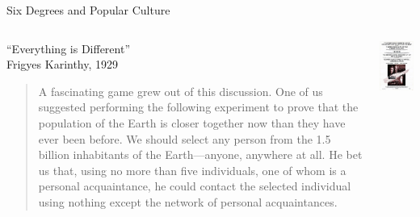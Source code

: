 \begin{frame}{Six Degrees and Popular Culture}

\begin{columns}
\begin{column}{0.65\textwidth}
\begin{block}{“Everything is Different”\\ Frigyes Karinthy, 1929}
\begin{quote}
{\footnotesize
A fascinating game grew out of this discussion. One of us suggested performing
the following experiment to prove that the population of the Earth is closer
together now than they have ever been before. We should select any person from
the 1.5 billion inhabitants of the Earth—anyone, anywhere at all. He bet us
that, using no more than five individuals, one of whom is a personal
acquaintance, he could contact the selected individual using nothing except
the network of personal acquaintances.}
\end{quote}
\end{block}
\end{column}
\begin{column}{0.35\textwidth}
	\includegraphics[width=\textwidth]{sixdegrees}
\end{column}
\end{columns}



\end{frame}
